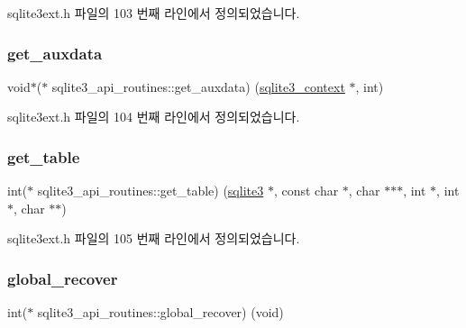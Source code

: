 sqlite3ext.\+h 파일의 103 번째 라인에서 정의되었습니다.

\mbox{\label{structsqlite3__api__routines_a1be39621e5074afbd0a81f105105866e}} 
\subsubsection{\texorpdfstring{get\+\_\+auxdata}{get\_auxdata}}
{\footnotesize\ttfamily void$\ast$($\ast$ sqlite3\+\_\+api\+\_\+routines\+::get\+\_\+auxdata) (\hyperlink{sqlite3_8h_a3b519553ffec8fc42b2356f5b1ebdc57}{sqlite3\+\_\+context} $\ast$, int)}



sqlite3ext.\+h 파일의 104 번째 라인에서 정의되었습니다.

\mbox{\label{structsqlite3__api__routines_a3a265a9fa59237ed1630acf4b4f5efc4}} 
\subsubsection{\texorpdfstring{get\+\_\+table}{get\_table}}
{\footnotesize\ttfamily int($\ast$ sqlite3\+\_\+api\+\_\+routines\+::get\+\_\+table) (\hyperlink{sqlite3_8h_a0ef6f2646262c8a9b24368d8ac140f69}{sqlite3} $\ast$, const char $\ast$, char $\ast$$\ast$$\ast$, int $\ast$, int $\ast$, char $\ast$$\ast$)}



sqlite3ext.\+h 파일의 105 번째 라인에서 정의되었습니다.

\mbox{\label{structsqlite3__api__routines_a11d469bd09340c52991a7d87fe212395}} 
\subsubsection{\texorpdfstring{global\+\_\+recover}{global\_recover}}
{\footnotesize\ttfamily int($\ast$ sqlite3\+\_\+api\+\_\+routines\+::global\+\_\+recover) (void)}



